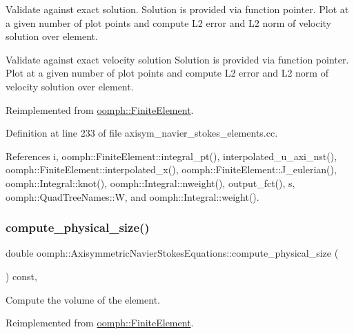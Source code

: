 Validate against exact solution. Solution is provided via function pointer. Plot at a given number of plot points and compute L2 error and L2 norm of velocity solution over element. 

Validate against exact velocity solution Solution is provided via function pointer. Plot at a given number of plot points and compute L2 error and L2 norm of velocity solution over element. 

Reimplemented from \hyperlink{classoomph_1_1FiniteElement_a73c79a1f1e5b1d334757812a6bbd58ff}{oomph\+::\+Finite\+Element}.



Definition at line 233 of file axisym\+\_\+navier\+\_\+stokes\+\_\+elements.\+cc.



References i, oomph\+::\+Finite\+Element\+::integral\+\_\+pt(), interpolated\+\_\+u\+\_\+axi\+\_\+nst(), oomph\+::\+Finite\+Element\+::interpolated\+\_\+x(), oomph\+::\+Finite\+Element\+::\+J\+\_\+eulerian(), oomph\+::\+Integral\+::knot(), oomph\+::\+Integral\+::nweight(), output\+\_\+fct(), s, oomph\+::\+Quad\+Tree\+Names\+::W, and oomph\+::\+Integral\+::weight().

\mbox{\label{classoomph_1_1AxisymmetricNavierStokesEquations_a37e908e68b52093af52ace8b0df0e173}} 
\subsubsection{\texorpdfstring{compute\+\_\+physical\+\_\+size()}{compute\_physical\_size()}}
{\footnotesize\ttfamily double oomph\+::\+Axisymmetric\+Navier\+Stokes\+Equations\+::compute\+\_\+physical\+\_\+size (\begin{DoxyParamCaption}{ }\end{DoxyParamCaption}) const\hspace{0.3cm}{\ttfamily [inline]}, {\ttfamily [virtual]}}



Compute the volume of the element. 



Reimplemented from \hyperlink{classoomph_1_1FiniteElement_a782a540035dc31cb6ef548d9d930d8b8}{oomph\+::\+Finite\+Element}.



